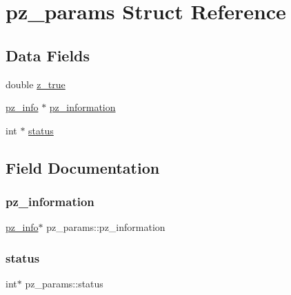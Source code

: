 \hypertarget{structpz__params}{}\section{pz\+\_\+params Struct Reference}
\label{structpz__params}
\subsection*{Data Fields}
\begin{DoxyCompactItemize}
\item 
double \mbox{\hyperlink{structpz__params_a3da0c3d23be2e3d319a506fa6e8a995a}{z\+\_\+true}}
\item 
\mbox{\hyperlink{structpz__info}{pz\+\_\+info}} $\ast$ \mbox{\hyperlink{structpz__params_a5d8a16c566f118a07c58d5e4e67e0963}{pz\+\_\+information}}
\item 
int $\ast$ \mbox{\hyperlink{structpz__params_aca361dcabadd103eb8d5cb9bac0745c5}{status}}
\end{DoxyCompactItemize}


\subsection{Field Documentation}
\mbox{\label{structpz__params_a5d8a16c566f118a07c58d5e4e67e0963}} 
\subsubsection{\texorpdfstring{pz\+\_\+information}{pz\_information}}
{\footnotesize\ttfamily \mbox{\hyperlink{structpz__info}{pz\+\_\+info}}$\ast$ pz\+\_\+params\+::pz\+\_\+information}

\mbox{\label{structpz__params_aca361dcabadd103eb8d5cb9bac0745c5}} 
\subsubsection{\texorpdfstring{status}{status}}
{\footnotesize\ttfamily int$\ast$ pz\+\_\+params\+::status}

\mbox{\label{structpz__params_a3da0c3d23be2e3d319a506fa6e8a995a}} 
